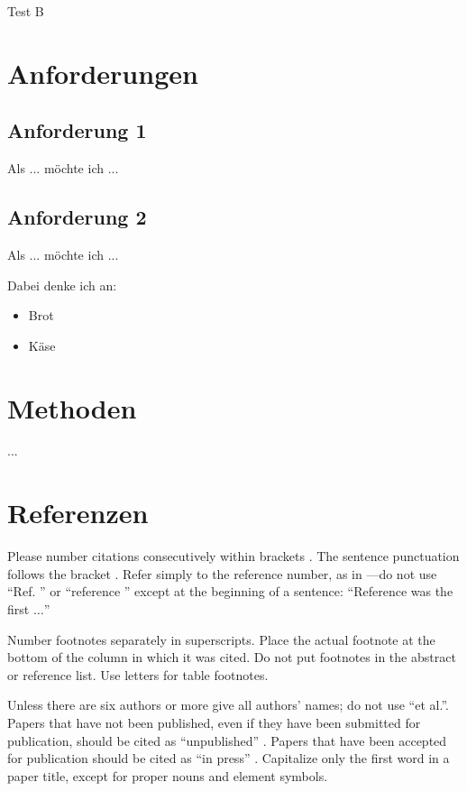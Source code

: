 \documentclass[conference]{IEEEtran}
\begin{document}
Test B

\section{Anforderungen}

\subsection{Anforderung 1}

Als ... möchte ich ...

\subsection{Anforderung 2}

Als ... möchte ich ...

Dabei denke ich an:

\begin{itemize}
	\item Brot
	\item Käse
\end{itemize}





\section{Methoden}

...





\section*{Referenzen}

Please number citations consecutively within brackets \cite{b1}. The 
sentence punctuation follows the bracket \cite{b2}. Refer simply to the reference 
number, as in \cite{b3}---do not use ``Ref. \cite{b3}'' or ``reference \cite{b3}'' except at 
the beginning of a sentence: ``Reference \cite{b3} was the first $\ldots$''

Number footnotes separately in superscripts. Place the actual footnote at 
the bottom of the column in which it was cited. Do not put footnotes in the 
abstract or reference list. Use letters for table footnotes.

Unless there are six authors or more give all authors' names; do not use 
``et al.''. Papers that have not been published, even if they have been 
submitted for publication, should be cited as ``unpublished'' \cite{b4}. Papers 
that have been accepted for publication should be cited as ``in press'' \cite{b5}. 
Capitalize only the first word in a paper title, except for proper nouns and 
element symbols.
\end{document}
